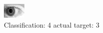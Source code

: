 \begin{figure}[h!]
\begin{center}
\includegraphics[width=0.60\columnwidth]{figures/ID318_class_4_target_3.png}
\end{center}
\caption{ Classification: 4 actual target: 3}
\label{fig:ID318_class_4_target_3}
\end{figure}
